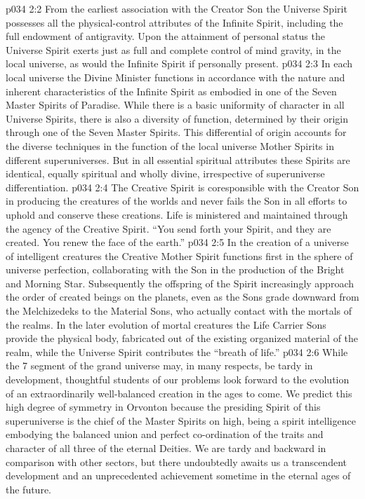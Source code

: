 \vs p034 2:2 From the earliest association with the Creator Son the Universe Spirit possesses all the physical\hyp{}control attributes of the Infinite Spirit, including the full endowment of antigravity. Upon the attainment of personal status the Universe Spirit exerts just as full and complete control of mind gravity, in the local universe, as would the Infinite Spirit if personally present.
\vs p034 2:3 \pc In each local universe the Divine Minister functions in accordance with the nature and inherent characteristics of the Infinite Spirit as embodied in one of the Seven Master Spirits of Paradise. While there is a basic uniformity of character in all Universe Spirits, there is also a diversity of function, determined by their origin through one of the Seven Master Spirits. This differential of origin accounts for the diverse techniques in the function of the local universe Mother Spirits in different superuniverses. But in all essential spiritual attributes these Spirits are identical, equally spiritual and wholly divine, irrespective of superuniverse differentiation.
\vs p034 2:4 \pc The Creative Spirit is coresponsible with the Creator Son in producing the creatures of the worlds and never fails the Son in all efforts to uphold and conserve these creations. Life is ministered and maintained through the agency of the Creative Spirit. “You send forth your Spirit, and they are created. You renew the face of the earth.”
\vs p034 2:5 In the creation of a universe of intelligent creatures the Creative Mother Spirit functions first in the sphere of universe perfection, collaborating with the Son in the production of the Bright and Morning Star. Subsequently the offspring of the Spirit increasingly approach the order of created beings on the planets, even as the Sons grade downward from the Melchizedeks to the Material Sons, who actually contact with the mortals of the realms. In the later evolution of mortal creatures the Life Carrier Sons provide the physical body, fabricated out of the existing organized material of the realm, while the Universe Spirit contributes the “breath of life.”
\vs p034 2:6 \pc While the 7 segment of the grand universe may, in many respects, be tardy in development, thoughtful students of our problems look forward to the evolution of an extraordinarily well\hyp{}balanced creation in the ages to come. We predict this high degree of symmetry in Orvonton because the presiding Spirit of this superuniverse is the chief of the Master Spirits on high, being a spirit intelligence embodying the balanced union and perfect co\hyp{}ordination of the traits and character of all three of the eternal Deities. We are tardy and backward in comparison with other sectors, but there undoubtedly awaits us a transcendent development and an unprecedented achievement sometime in the eternal ages of the future.

